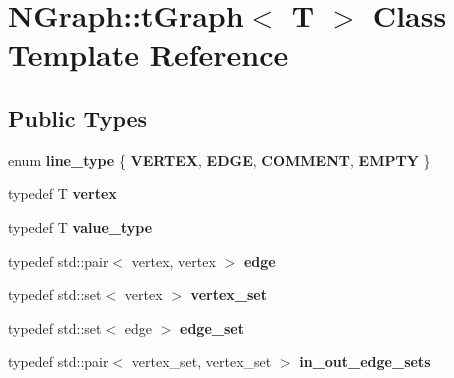 \hypertarget{class_n_graph_1_1t_graph}{}\section{N\+Graph\+:\+:t\+Graph$<$ T $>$ Class Template Reference}
\label{class_n_graph_1_1t_graph}
\subsection*{Public Types}
\begin{DoxyCompactItemize}
\item 
\mbox{\label{class_n_graph_1_1t_graph_a4a14eff6bcee7d8c0528c13d5e99ad71}} 
enum {\bfseries line\+\_\+type} \{ {\bfseries V\+E\+R\+T\+EX}, 
{\bfseries E\+D\+GE}, 
{\bfseries C\+O\+M\+M\+E\+NT}, 
{\bfseries E\+M\+P\+TY}
 \}
\item 
\mbox{\label{class_n_graph_1_1t_graph_a63a04bf8bfc7cf968be524208f49fdee}} 
typedef T {\bfseries vertex}
\item 
\mbox{\label{class_n_graph_1_1t_graph_addb8e5aa5779f80e19e368eef9448e8c}} 
typedef T {\bfseries value\+\_\+type}
\item 
\mbox{\label{class_n_graph_1_1t_graph_a6c85cd9c55a19c3c052f176fe719fdfc}} 
typedef std\+::pair$<$ vertex, vertex $>$ {\bfseries edge}
\item 
\mbox{\label{class_n_graph_1_1t_graph_a9e0a5df1ac9a2e6df94431aeaf610b3e}} 
typedef std\+::set$<$ vertex $>$ {\bfseries vertex\+\_\+set}
\item 
\mbox{\label{class_n_graph_1_1t_graph_a18a0c72c7ef57d877cab05bba5cf4d9b}} 
typedef std\+::set$<$ edge $>$ {\bfseries edge\+\_\+set}
\item 
\mbox{\label{class_n_graph_1_1t_graph_a9822c284aa101d90d3bd613c7e05eaa4}} 
typedef std\+::pair$<$ vertex\+\_\+set, vertex\+\_\+set $>$ {\bfseries in\+\_\+out\+\_\+edge\+\_\+sets}
\item 
\mbox{\label{class_n_graph_1_1t_graph_a0036686b7a2d33d0c2aeca3f6715495d}} 

\end{DoxyCompactItemize}
